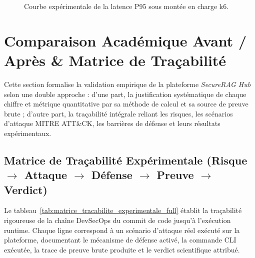 \begin{figure}[H]
\centering
\scriptsize
{}
\caption{Courbe expérimentale de la latence P95 sous montée en charge k6.}
\label{fig:k6_chart_full_section}
\end{figure}


\section{Comparaison Académique Avant / Après \& Matrice de Traçabilité}
\label{sec:comparaison_avant_apres}

Cette section formalise la validation empirique de la plateforme \textit{SecureRAG Hub} selon une double approche : d'une part, la justification systématique de chaque chiffre et métrique quantitative par sa méthode de calcul et sa source de preuve brute ; d'autre part, la traçabilité intégrale reliant les risques, les scénarios d'attaque MITRE ATT\&CK, les barrières de défense et leurs résultats expérimentaux.

\subsection{Matrice de Traçabilité Expérimentale (Risque $\rightarrow$ Attaque $\rightarrow$ Défense $\rightarrow$ Preuve $\rightarrow$ Verdict)}

Le tableau~\ref{tab:matrice_tracabilite_experimentale_full} établit la traçabilité rigoureuse de la chaîne DevSecOps du commit de code jusqu'à l'exécution runtime. Chaque ligne correspond à un scénario d'attaque réel exécuté sur la plateforme, documentant le mécanisme de défense activé, la commande CLI exécutée, la trace de preuve brute produite et le verdict scientifique attribué.

